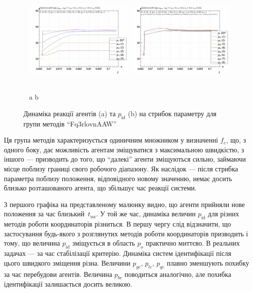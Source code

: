 \begin{figure}[htb!]
  \begin{center}
    ~ \hfill
    \includegraphics[width=0.48\textwidth]{p/sign/qls-p_t_pi_m_Fq3rlovnAAW_sign.png}
    \hfill
    \includegraphics[width=0.48\textwidth]{p/sign/qls-p_t_p_m_Fq3rlovnAAW_sign.png}
    \hfill ~
  \end{center}
  \vspace{-1.0ex}
  \begin{center}
    ~ \hfill a \hfill\hfill b  \hfill ~
  \end{center}
  \vspace{-1.5ex}
  \caption{Динаміка реакції агентів (a) та $p_\mathrm{id}$ (b) на стрибок параметру для групи методів ``Fq3rlovnAAW''}
  \label{atu:f:Fq3rlovnAAW_sign}
\end{figure}

Ця група методів характеризується одиничним множником у визначенні $f_e$, що,
з одного боку, дає можливість агентам зміщуватися з максимальною швидкістю, з
іншого --- призводить до того, що ``далекі'' агенти зміщуються сильно,
займаючи місце поблизу границі свого робочого діапазону. Як наслідок --- після
стрибка параметра поблизу положення, відповідного новому значенню, немає
досить близько розташованого агента, що збільшує час реакції системи.

З першого графіка на представленому малюнку видно, що агенти
прийняли нове положення за час близький~$t_{ua}$.
У той же час, динаміка величин
$ p_\mathrm{id} $ для різних методів роботи координаторів різниться. В
першу чергу слід відзначити, що застосування будь-якого з
розглянутих методів роботи координаторів призводить і тому,
що величина
$ p_\mathrm{id} $ зміщується в область
$ p_o $ практично миттєво. В реальних задачах --- за час стабілізації
критерію. Динаміка систем ідентифікації після цього швидкого
зміщення різна. Величини
$ p_{gc} $,
$ p_{lc} $,
$ p_{qc} $ плавно зменшують похибку за час перебудови
агентів. Величина
$ p_{bc} $ поводиться аналогічно, але похибка ідентифікації
залишається досить великою.

